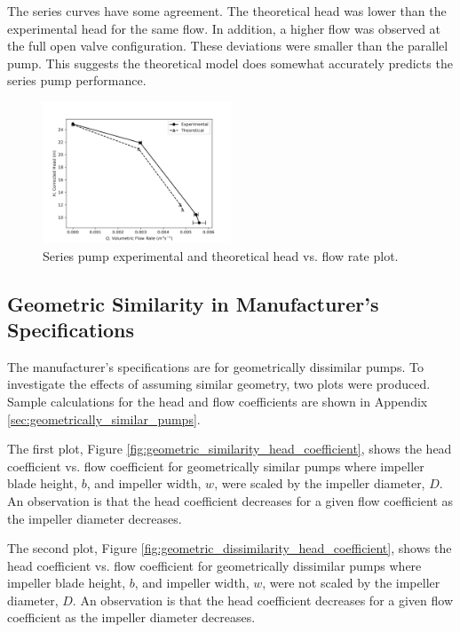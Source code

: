 The series curves have some agreement. The theoretical head was lower than the experimental head for the same flow. In addition, a higher flow was observed at the full open valve configuration. These deviations were smaller than the parallel pump. This suggests the theoretical model does somewhat accurately predicts the series pump performance.

\begin{figure}[H]
    \centering
    \includegraphics[width=0.5\textwidth]{Sections/Figures/Series Pump Plot.png}
    \caption{Series pump experimental and theoretical head vs. flow rate plot.}
    \label{fig:series_pump_plot}
\end{figure}

\subsection{Geometric Similarity in Manufacturer's Specifications}
The manufacturer's specifications are for geometrically dissimilar pumps. To investigate the effects of assuming similar geometry, two plots were produced. Sample calculations for the head and flow coefficients are shown in Appendix \ref{sec:geometrically_similar_pumps}.

The first plot, Figure \ref{fig:geometric_similarity_head_coefficient}, shows the head coefficient vs. flow coefficient for geometrically similar pumps where impeller blade height, $b$, and impeller width, $w$, were scaled by the impeller diameter, $D$. An observation is that the head coefficient decreases for a given flow coefficient as the impeller diameter decreases.  

The second plot, Figure \ref{fig:geometric_dissimilarity_head_coefficient}, shows the head coefficient vs. flow coefficient for geometrically dissimilar pumps where impeller blade height, $b$, and impeller width, $w$, were not scaled by the impeller diameter, $D$. An observation is that the head coefficient decreases for a given flow coefficient as the impeller diameter decreases. 

